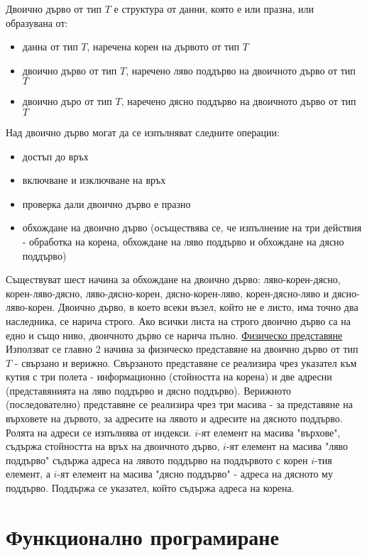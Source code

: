 \documentclass{article}
\begin{document}
Двоично дърво от тип $T$ е структура от данни, която е или празна, или образувана от:
\begin{itemize}
    \item данна от тип $T$, наречена корен на дървото от тип $T$
    \item двоично дърво от тип $T$, наречено ляво поддърво на двоичното дърво от тип $T$
    \item двоично дъро от тип $T$, наречено дясно поддърво на двоичното дърво от тип $T$
\end{itemize}
Над двоично дърво могат да се изпълняват следните операции:
\begin{itemize}
    \item достъп до връх
    \item включване и изключване на връх
    \item проверка дали двоично дърво е празно
    \item обхождане на двоично дърво (осъществява се, че изпълнение на три действия - обработка на корена, обхождане на ляво
    поддърво и обхождане на дясно поддърво)
\end{itemize}
Съществуват шест начина за обхождане на двоично дърво: ляво-корен-дясно, корен-ляво-дясно, ляво-дясно-корен, дясно-корен-ляво,
корен-дясно-ляво и дясно-ляво-корен. Двоично дърво, в което всеки възел, който не е листо, има точно два наследника, се нарича
строго. Ако всички листа на строго двоично дърво са на едно и също ниво, двоичното дърво се нарича пълно. \newline\newline
\underline{Физическо представяне} \newline
Използват се главно 2 начина за физическо представяне на двоично дърво от тип $T$ - свързано и верижно. Свързаното представяне
се реализира чрез указател към кутия с три полета - информационно (стойността на корена) и две адресни (представянията на ляво
поддърво и дясно поддърво). Верижното (последователно) представяне се реализира чрез три масива - за представяне на върховете на
дървото, за адресите на лявото и адресите на дясното поддърво. Ролята на адреси се изпълнява от индекси. $i$-ят елемент на
масива "върхове", съдържа стойността на връх на двоичното дърво, $i$-ят елемент на масива "ляво поддърво" съдържа адреса на
лявото поддърво на поддървото с корен $i$-тия елемент, а $i$-ят елемент на масива "дясно поддърво" - адреса на дясното му поддърво.
Поддържа се указател, който съдържа адреса на корена.
\section*{Функционално програмиране}
\end{document}
